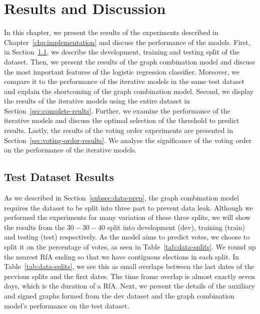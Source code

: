 \chapter{Results and Discussion} 
\label{chp:results}
In this chapter, we present the results of the experiments described in Chapter~\ref{chp:implementation} and discuss the performance of the models.
First, in Section~\ref{sec:test-data-results}, we describe the development, training and testing split of the dataset.
Then, we present the results of the graph combination model and discuss the most important features of the logistic regression classifier.
Moreover, we compare it to the performance of the iterative models in the same test dataset and explain the shortcoming of the graph combination model.
Second, we display the results of the iterative models using the entire \wikirfa dataset in Section~\ref{sec:complete-reults}.
Further, we examine the performance of the iterative models and discuss the optimal selection of the threshold to predict results.
Lastly, the results of the voting order experiments are presented in Section~\ref{sec:voting-order-results}.
We analyse the significance of the voting order on the performance of the iterative models.


\section{Test Dataset Results}
\label{sec:test-data-results}
As we described in Section~\ref{subsec:data-prep}, the graph combination model requires the \wikirfa dataset to be split into three part to prevent data leak.
Although we performed the experiments for many variation of these three splits, we will show the results from the $30-30-40$ split into development (dev), training (train) and testing (test) respectively.
As the model aims to predict votes, we choose to split it on the percentage of votes, as seen in Table~\ref{tab:data-splits}.
We round up the nearest RfA ending so that we have contiguous elections in each split.
In Table~\ref{tab:data-splits}, we see this as small overlaps between the last dates of the previous splits and the first dates.
The time frame overlap is almost exactly seven days, which is the duration of a RfA.
Next, we present the details of the auxiliary and signed graphs formed from the dev dataset and the graph combination model's performance on the test dataset.

